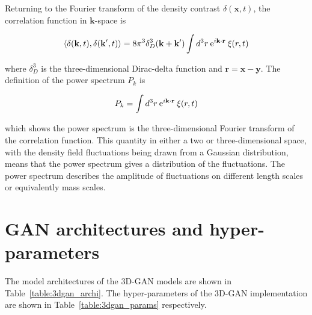 \documentclass[twocolumn]{article}
\numberwithin{equation}{section}
\begin{document}
Returning to the Fourier transform of the density contrast $\delta(\mathbf{x},t)$, the correlation function in 
$\mathbf{k}$-space is 

\begin{equation}
    \langle \delta(\mathbf{k},t), \delta(\mathbf{k}',t) \rangle = 8\pi^3 \delta^3_D(\mathbf{k} + \mathbf{k}') \int d^3 r 
    \: \textup{e}^{i\mathbf{k}\cdot\mathbf{r}} \: \xi(r,t)
\end{equation}

where $\delta_D^3$ is the three-dimensional Dirac-delta function and $\mathbf{r} = \mathbf{x}-\mathbf{y}$. The definition
of the power spectrum $P_k$ is 

\begin{equation}
    P_k = \int d^3 r \: \textup{e}^{i\mathbf{k}\cdot\mathbf{r}} \: \xi(r,t)
\end{equation}

which shows the power spectrum is the three-dimensional Fourier transform of the correlation function. This quantity in 
either a two or three-dimensional space, with the density field fluctuations being drawn from a Gaussian distribution, means
that the power spectrum gives a distribution of the fluctuations. The power spectrum describes the amplitude of fluctuations
on different length scales or equivalently mass scales.


\section{GAN architectures and hyper-parameters}\label{appendix:gan_setups}

The model architectures of the 3D-GAN models are shown in Table~\ref{table:3dgan_archi}. The hyper-parameters of the 3D-GAN 
implementation are shown in Table~\ref{table:3dgan_params} respectively. 
\end{document}
